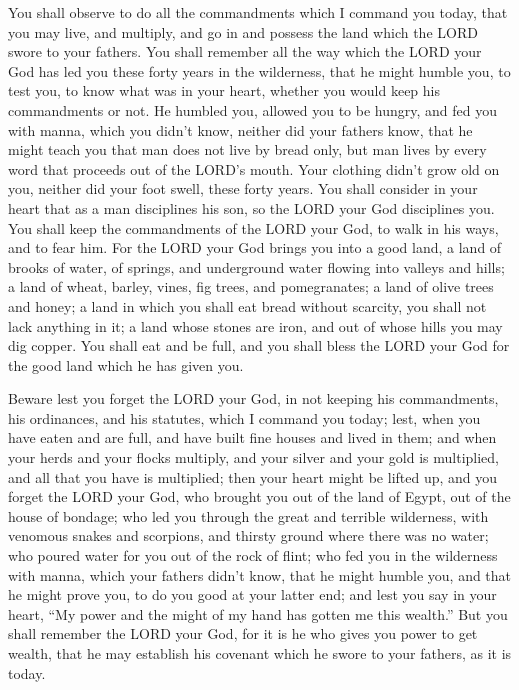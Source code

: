 	
\mychapter{} \myverse*{}You shall observe to do all the commandments which I command you
today, that you may live, and multiply, and go in and possess the land which the LORD swore to your fathers.
\myverse{}You shall remember all the way which the LORD your God has led you these forty
years in the wilderness, that he might humble you, to test you, to know what was in your heart, whether
you would keep his commandments or not.
\myverse{}He humbled you, allowed you to be hungry, and fed you with manna, which you
didn’t know, neither did your fathers know, that he might teach you that man does not live by bread only,
but man lives by every word that proceeds out of the LORD’s mouth.
\myverse{}Your clothing didn’t grow old on you, neither did your foot swell, these forty
years.
\myverse{}You shall consider in your heart that as a man disciplines his son, so the LORD
your God disciplines you.
\myverse{}You shall keep the commandments of the LORD your God, to walk in his ways, and
to fear him.
\myverse{}For the LORD your God brings you into a good land, a land of brooks of water,
of springs, and underground water flowing into valleys and hills;
\myverse{}a land of wheat, barley, vines, fig trees, and pomegranates; a land of olive
trees and honey;
\myverse{}a land in which you shall eat bread without scarcity, you shall not lack anything
in it; a land whose stones are iron, and out of whose hills you may dig copper.
\myverse{}You shall eat and be full, and you shall bless the LORD your God for the good
land which he has given you.


\myverse{}Beware lest you forget the LORD your God, in not keeping his
commandments, his ordinances, and his statutes, which I command you today;
\myverse{}lest, when you have eaten and are full, and have built fine houses and lived
in them;
\myverse{}and when your herds and your flocks multiply, and your silver and your gold
is multiplied, and all that you have is multiplied;
\myverse{}then your heart might be lifted up, and you forget the LORD your God, who
brought you out of the land of Egypt, out of the house of bondage;
\myverse{}who led you through the great and terrible wilderness, with venomous snakes
and scorpions, and thirsty ground where there was no water; who poured water for you out of the rock of
flint;
\myverse{}who fed you in the wilderness with manna, which your fathers didn’t know,
that he might humble you, and that he might prove you, to do you good at your latter end;
\myverse{}and lest you say in your heart, “My power and the might of my hand has gotten
me this wealth.”
\myverse{}But you shall remember the LORD your God, for it is he who gives you power
to get wealth, that he may establish his covenant which he swore to your fathers, as it is today.


